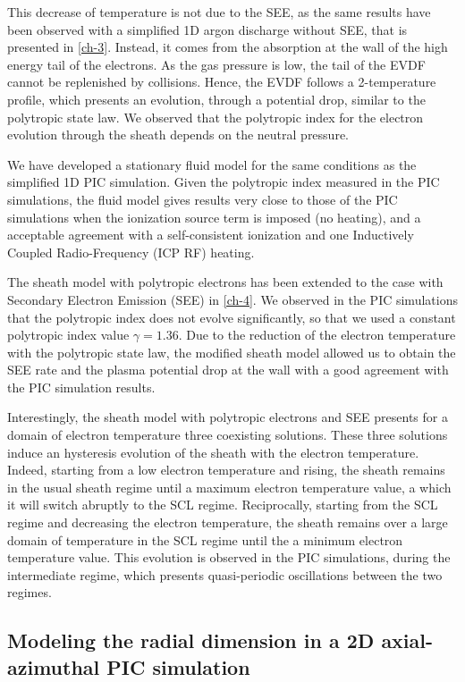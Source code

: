 This decrease of temperature is not due to the SEE, as the same results have been observed with a simplified 1D argon discharge without SEE, that is presented in \cref{ch-3}.
Instead, it comes from the absorption at the wall of the high energy tail of the electrons.
As the gas pressure is low, the tail of the EVDF cannot be replenished by collisions.
Hence, the EVDF follows a 2-temperature profile, which presents an evolution, through a potential drop, similar to the polytropic state law. 
We observed that the polytropic index for the electron evolution through the sheath depends on the neutral pressure.

We have developed a stationary fluid model for the same conditions as the simplified 1D PIC simulation.
Given the polytropic index measured in the PIC simulations, the fluid model gives results very close to those of the PIC simulations when the ionization source term is imposed (no heating), and a acceptable agreement with a self-consistent ionization and one Inductively Coupled Radio-Frequency (ICP RF) heating.

\vspace{1ex}
The sheath model with polytropic electrons has been extended to the case with Secondary Electron Emission (SEE) in \cref{ch-4}.
We observed in the PIC simulations that the polytropic index does not evolve significantly, so that we used a constant polytropic index value $\gamma=1.36$.
Due to the reduction of the electron temperature with the polytropic state law, the modified sheath model allowed us to obtain the SEE rate and the plasma potential drop at the wall with a good agreement with the PIC simulation results.

Interestingly, the sheath model with polytropic electrons and SEE presents for a domain of electron temperature three coexisting solutions.
These three solutions induce an hysteresis evolution of the sheath with the electron temperature.
Indeed, starting from a low electron temperature and rising, the sheath remains in the usual sheath regime until a maximum electron temperature value, a which it will switch abruptly to the SCL regime.
Reciprocally, starting from the SCL regime and decreasing the electron temperature, the sheath remains over a large domain of temperature in the SCL regime until the a minimum electron temperature value.
This evolution is observed in the PIC simulations, during the intermediate regime, which presents quasi-periodic oscillations between the two regimes. 


\subsection{Modeling the radial dimension in a 2D axial-azimuthal PIC simulation}

